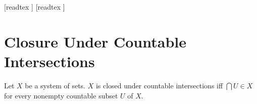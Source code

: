 \documentclass[10pt]{article}
\begin{document}
  \begin{imports}
    \begin{forthel}
      [readtex ]
      [readtex ]
    \end{forthel}
  \end{imports}


  \section*{Closure Under Countable Intersections}

  \begin{forthel}
    \begin{definition}
      Let $X$ be a system of sets.
      $X$ is closed under countable intersections iff $\bigcap U \in X$ for every nonempty countable subset $U$ of $X$.
    \end{definition}
  \end{forthel}
\end{document}

